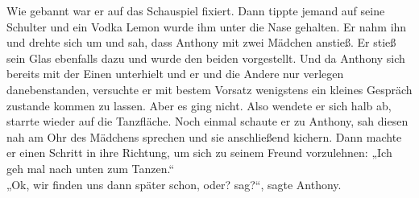 \documentclass[ngerman,smalldemyvopaper,11pt,oneside,onecolumn,openright,extrafontsizes]{memoir}
\begin{document}
Wie gebannt war er auf das Schauspiel fixiert. Dann tippte jemand auf seine Schulter und ein Vodka Lemon wurde ihm unter die Nase gehalten. Er nahm ihn und drehte sich um und sah, dass Anthony mit zwei Mädchen anstieß. Er stieß sein Glas ebenfalls dazu und wurde den beiden vorgestellt. Und da Anthony sich bereits mit der Einen unterhielt und er und die Andere nur verlegen danebenstanden, versuchte er mit bestem Vorsatz wenigstens ein kleines Gespräch zustande kommen zu lassen. Aber es ging nicht. Also wendete er sich halb ab, starrte wieder auf die Tanzfläche. Noch einmal schaute er zu Anthony, sah diesen nah am Ohr des Mädchens sprechen und sie anschließend kichern. Dann machte er einen Schritt in ihre Richtung, um sich zu seinem Freund vorzulehnen: „Ich geh mal nach unten zum Tanzen.“
\vspace{0.5em} \\
„Ok, wir finden uns dann später schon, oder? sag?“, sagte Anthony.
\vspace{0.5em} \\
\end{document}
